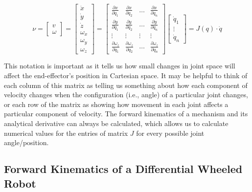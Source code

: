 \begin{equation}\label{eq:kinematics:diff:fwd}
\nu = \left[\begin{array}{c}v\\\omega\end{array}\right]=
\left[\begin{array}{c}\dot{x}\\
\dot{y}\\
\dot{z}\\
\omega_x\\
\omega_y\\
\omega_z\end{array}\right]=
\left[\begin{array}{cccc}\frac{\partial{x}}{\partial{q_1}} & \frac{\partial{x}}{\partial{q_2}} & \ldots & \frac{\partial{x}}{\partial{q_n}}\\\frac{\partial{y}}{\partial{q_1}} & \frac{\partial{y}}{\partial{q_2}} & \ldots & \frac{\partial{y}}{\partial{q_n}}\\\vdots & \vdots & \vdots & \vdots\\\frac{\partial{\omega_z}}{\partial{q_1}} & \frac{\partial{\omega_z}}{\partial{q_2}} & \ldots & \frac{\partial{\omega_z}}{\partial{q_n}}\end{array}\right]\left[\begin{array}{c}\dot{q}_1\\\vdots\\\dot{q}_n\end{array}\right] = J (q) \cdot \dot{q}
\end{equation}

This notation is important as it tells us how small changes in joint space will affect the end-effector's position in Cartesian space. It may be helpful to think of each column of this matrix as telling us something about how each component of velocity changes when the configuration (i.e., angle) of a particular joint changes, or each row of the matrix as showing how movement in each joint affects a particular component of velocity. The forward kinematics of a mechanism and its analytical derivative can always be calculated, which allows us to calculate numerical values for the entries of matrix $J$ for every possible joint angle/position.

\subsection{Forward Kinematics of a Differential Wheeled Robot}\label{sec:kinematics:fwk:mobile}

